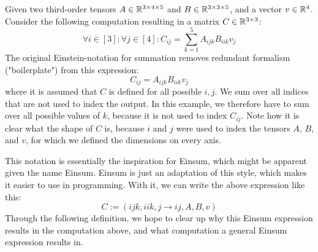 Given two third-order tensors $A \in \mathbb{R}^{3 \times 4 \times 5}$ and $B \in \mathbb{R}^{3 \times 3 \times 5}$, and a vector $v \in \mathbb{R}^4$.
Consider the following computation resulting in a matrix $C \in \mathbb{R}^{3 \times 3}$:
$$\forall i \in [3]: \forall j \in [4]: C_{ij} = \sum\limits_{k = 1}^{5} A_{ijk} B_{iik} v_j$$
The original Einstein-notation for summation removes redundant formalism ("boilerplate") from this expression:
$$C_{ij} = A_{ijk} B_{iik} v_j$$
where it is assumed that $C$ is defined for all possible $i,j$.
We sum over all indices that are not used to index the output.
In this example, we therefore have to sum over all possible values of $k$, because it is not used to index $C_{ij}$.
Note how it is clear what the shape of $C$ is, because $i$ and $j$ were used to index the tensors $A$, $B$, and $v$,
for which we defined the dimensions on every axis.

This notation is essentially the inspiration for Einsum, which might be apparent given the name Einsum.
Einsum is just an adaptation of this style, which makes it easier to use in programming.
With it, we can write the above expression like this:
$$C := (ijk, iik, j \rightarrow ij, A, B, v)$$
Through the following definition, we hope to clear up why this Einsum expression results in the computation above,
and what computation a general Einsum expression results in.

